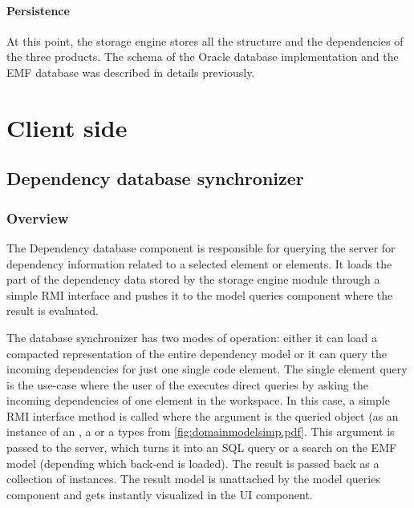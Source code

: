 \paragraph{Persistence}
At this point, the storage engine stores all the structure and the dependencies 
of the three products. The schema of the Oracle database implementation and the EMF
database was described in details previously.



\section{Client side}
\subsection{Dependency database synchronizer}
\label{sect:depdbsynch}

\subsubsection{Overview}
The Dependency database component is responsible for querying the server for
dependency information related to a selected element or elements. It loads the
part of the dependency data stored by the storage engine module through a
simple RMI interface and pushes it to the model queries component where the
result is evaluated.

The database synchronizer has two modes of operation: either it can load a compacted
representation of the entire dependency model or it can query the incoming
dependencies for just one single code element.
The single element query is the use-case where the user of the \ptool{} executes
direct queries by asking the incoming dependencies of one element in the
workspace. In this case, a simple RMI interface method is called where the
argument is the queried object (as an instance of an , a  or a
 types from \autoref{fig:domainmodelsimp.pdf}. This argument is passed to
the server, which turns it into an SQL query or a search on the EMF model
(depending which back-end is loaded). The result is passed back as a collection
of  instances. The result model is unattached by the model
queries component and gets instantly visualized in the UI component.


